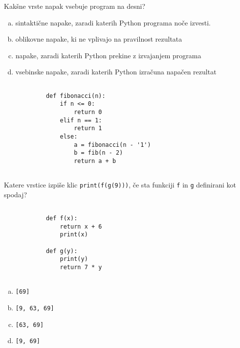 \documentclass[arhiv, 10pt]{../izpit}
\newcommand{\inlinepy}[1]{\texttt{#1}}
\begin{document}
        \naloga*
        \begin{multicols}{2}
        \noindent
        Kakšne vrste napak vsebuje program na desni?

        \begin{enumerate}[(a)]
\item sintaktične napake, zaradi katerih Python programa noče izvesti.
\item oblikovne napake, ki ne vplivajo na pravilnost rezultata
\item napake, zaradi katerih Python prekine z izvajanjem programa
\item vsebinske napake, zaradi katerih Python izračuna napačen rezultat
\end{enumerate}

        \columnbreak

        \begin{verbatim}
        
            def fibonacci(n):
                if n <= 0:
                    return 0
                elif n == 1:
                    return 1
                else:
                    a = fibonacci(n - '1')
                    b = fib(n - 2)
                    return a + b
            
        \end{verbatim}

        \end{multicols}

    
        \naloga*
        Katere vrstice izpiše klic \inlinepy{print(f(g(9)))}, če sta funkciji \inlinepy{f} in \inlinepy{g} definirani kot spodaj?

        \begin{multicols}{2}
        \begin{verbatim}
        
            def f(x):
                return x + 6
                print(x)

            def g(y):
                print(y)
                return 7 * y
        
        \end{verbatim}

        \begin{enumerate}[(a)]
\item \inlinepy{[69]}
\item \inlinepy{[9, 63, 69]}
\item \inlinepy{[63, 69]}
\item \inlinepy{[9, 69]}
\end{enumerate}

        \end{multicols}
    
\end{document}
